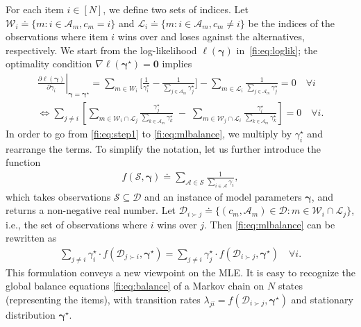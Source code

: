 For each item $i \in [N]$, we define two sets of indices.
Let $\mathcal{W}_i \doteq \{ m : i \in \mathcal{A}_m, c_m = i \}$ and $\mathcal{L}_i \doteq \{ m : i \in \mathcal{A}_m, c_m \ne i \}$ be the indices of the observations where item $i$ wins over and loses against the alternatives, respectively.
We start from the log-likelihood $\ell(\bm{\gamma})$ in~\eqref{fi:eq:loglik};
the optimality condition $\nabla \ell(\bm{\gamma}^\star) = \bm{0}$ implies
\begin{align}
\left. \frac{\partial \ell(\bm{\gamma})}{\partial \gamma_i} \right\rvert_{\bm{\gamma} = \bm{\gamma}^\star}
    = \sum_{m \in W_i} \bigg[ \frac{1}{\gamma^\star_i} - \frac{1}{\sum_{j \in \mathcal{A}_m} \gamma^\star_j} \bigg]
      - \sum_{m \in \mathcal{L}_i} \frac{1}{\sum_{j \in \mathcal{A}_m} \gamma^\star_j} = 0 \quad \forall i \label{fi:eq:step1} \\
\iff  \sum_{j \ne i} \left[
    \sum_{m \in \mathcal{W}_i \cap \mathcal{L}_j} \frac{\gamma^\star_j}{\sum_{k \in \mathcal{A}_m} \gamma^\star_k}
    \;-\; \sum_{m \in \mathcal{W}_j \cap \mathcal{L}_i} \frac{\gamma^\star_i}{\sum_{k \in \mathcal{A}_m} \gamma^\star_k}
    \right] = 0 \quad \forall i. \label{fi:eq:mlbalance}
\end{align}
In order to go from \eqref{fi:eq:step1} to \eqref{fi:eq:mlbalance}, we multiply by $\gamma^\star_i$ and rearrange the terms.
To simplify the notation, let us further introduce the function
\begin{align*}
f(\mathcal{S}, \bm{\gamma}) \doteq \sum_{\mathcal{A} \in \mathcal{S}} \frac{1}{\sum_{i \in \mathcal{A}} \gamma_i},
\end{align*}
which takes observations $\mathcal{S} \subseteq \mathcal{D}$ and an instance of model parameters $\bm{\gamma}$, and returns a non-negative real number.
Let $\mathcal{D}_{i \succ j} \doteq \{ (c_m, \mathcal{A}_m) \in \mathcal{D} : m \in \mathcal{W}_i \cap \mathcal{L}_j \}$, i.e., the set of observations where $i$ wins over $j$.
Then \eqref{fi:eq:mlbalance} can be rewritten as
\begin{align}
\label{fi:eq:master}
\sum_{j \ne i} \gamma^\star_i \cdot f(\mathcal{D}_{j \succ i}, \bm{\gamma}^\star)
= \sum_{j \ne i} \gamma^\star_j \cdot f(\mathcal{D}_{i \succ j}, \bm{\gamma}^\star) \quad \forall i.
\end{align}
This formulation conveys a new viewpoint on the MLE.
It is easy to recognize the global balance equations \eqref{fi:eq:balance} of a Markov chain on $N$ states (representing the items), with transition rates $\lambda_{ji} = f(\mathcal{D}_{i \succ j}, \bm{\gamma}^\star)$ and stationary distribution $\bm{\gamma}^\star$.
